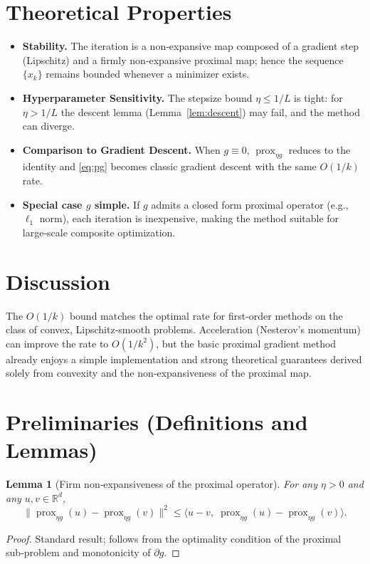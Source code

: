 \documentclass{article}
\newtheorem{lemma}{Lemma}
\begin{document}
\section*{Theoretical Properties}
\begin{itemize}[nosep]
\item \textbf{Stability.} The iteration is a non‑expansive map composed of a gradient step (Lipschitz) and a firmly non‑expansive proximal map; hence the sequence $\{x_{k}\}$ remains bounded whenever a minimizer exists.

\item \textbf{Hyperparameter Sensitivity.} The stepsize bound $\eta\le 1/L$ is tight: for $\eta>1/L$ the descent lemma (Lemma~\ref{lem:descent}) may fail, and the method can diverge.

\item \textbf{Comparison to Gradient Descent.} When $g\equiv0$, $\operatorname{prox}_{\eta g}$ reduces to the identity and \eqref{eq:pg} becomes classic gradient descent with the same $O(1/k)$ rate.

\item \textbf{Special case $g$ simple.} If $g$ admits a closed form proximal operator (e.g., $\ell_{1}$ norm), each iteration is inexpensive, making the method suitable for large‑scale composite optimization.
\end{itemize}

\section*{Discussion}
The $O(1/k)$ bound matches the optimal rate for first‑order methods on the class of convex, Lipschitz‑smooth problems. Acceleration (Nesterov’s momentum) can improve the rate to $O(1/k^{2})$, but the basic proximal gradient method already enjoys a simple implementation and strong theoretical guarantees derived solely from convexity and the non‑expansiveness of the proximal map.

\newpage
\section*{Preliminaries (Definitions and Lemmas)}

\begin{lemma}[Firm non‑expansiveness of the proximal operator]\label{lem:firm}
For any $\eta>0$ and any $u,v\in\mathbb{R}^{d}$,
\[
\big\|\operatorname{prox}_{\eta g}(u)-\operatorname{prox}_{\eta g}(v)\big\|^{2}
\le \langle u-v,\;\operatorname{prox}_{\eta g}(u)-\operatorname{prox}_{\eta g}(v)\rangle .
\]
\end{lemma}
\begin{proof}
Standard result; follows from the optimality condition of the proximal sub‑problem and monotonicity of $\partial g$. \qedhere
\end{proof}
\end{document}
